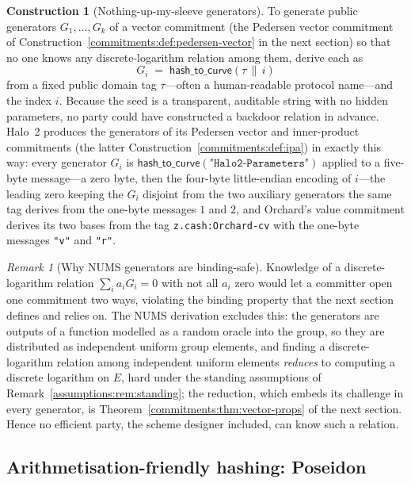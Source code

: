 \documentclass[11pt,a4paper]{article}
\theoremstyle{definition}
\newtheorem{construction}[theorem]{Construction}
\theoremstyle{remark}
\newtheorem{remark}[theorem]{Remark}
\begin{document}
\begin{construction}[Nothing-up-my-sleeve generators]
\label{hash:con:nums}
To generate public generators \(G_{1}, \dots, G_{k}\) of a vector
commitment (the Pedersen vector commitment of
Construction~\ref{commitments:def:pedersen-vector} in the next
section) so that no one knows any discrete-logarithm relation among
them, derive each as
\[
G_{i} \;=\; \mathsf{hash\_to\_curve}(\tau \,\|\, i)
\]
from a fixed public domain tag \(\tau\)---often a human-readable
protocol name---and the index \(i\). Because the seed is a
transparent, auditable string with no hidden parameters, no party
could have constructed a backdoor relation in advance. Halo~2 produces
the generators of its Pedersen vector and inner-product commitments
(the latter Construction~\ref{commitments:def:ipa}) in exactly this
way: every generator \(G_{i}\) is
\(\mathsf{hash\_to\_curve}(\texttt{"Halo2-Parameters"})\) applied to
a five-byte message---a zero byte, then the four-byte little-endian
encoding of \(i\)---the leading zero keeping the \(G_{i}\) disjoint
from the two auxiliary generators the same tag derives from the
one-byte messages \(1\) and \(2\), and Orchard's value
commitment derives its two bases from the tag
\texttt{z.cash:Orchard-cv} with the one-byte messages \texttt{"v"}
and \texttt{"r"}.
\end{construction}

\begin{remark}[Why NUMS generators are binding-safe]
\label{hash:rem:nums-binding}
Knowledge of a discrete-logarithm relation
\(\sum_{i} a_{i} G_{i} = 0\) with not all \(a_{i}\) zero would let a
committer open one commitment two ways, violating the binding
property that the next section defines and relies on. The NUMS
derivation excludes this: the generators are outputs of a function
modelled as a random oracle into the group, so they are distributed as
independent uniform group elements, and finding a discrete-logarithm
relation among independent uniform elements \emph{reduces} to
computing a discrete logarithm on \(E\), hard under the standing
assumptions of Remark~\ref{assumptions:rem:standing}; the reduction,
which embeds its challenge in every generator, is
Theorem~\ref{commitments:thm:vector-props} of the next section. Hence
no efficient party, the scheme designer included, can know such a
relation.
\end{remark}

\subsection{Arithmetisation-friendly hashing: Poseidon}
\label{hash:subsec:poseidon}
\end{document}
